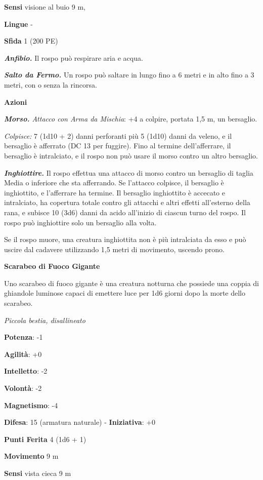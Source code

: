 \begin{multicols}{2}
\textbf{Sensi} visione al buio 9 m, 

\textbf{Lingue} -

\textbf{Sfida} 1 (200 PE)

\emph{\textbf{Anfibio.}} Il rospo può respirare aria e acqua.

\emph{\textbf{Salto da Fermo.}} Un rospo può saltare in lungo fino a 6
metri e in alto fino a 3 metri, con o senza la rincorsa.

\textbf{Azioni}

\emph{\textbf{Morso.} Attacco con Arma da Mischia}: +4 a colpire,
portata 1,5 m, un bersaglio.

\emph{Colpisce:} 7 (1d10 + 2) danni perforanti più 5 (1d10) danni da
veleno, e il bersaglio è afferrato (DC 13 per fuggire). Fino al termine
dell'afferrare, il bersaglio è intralciato, e il rospo non può usare il
morso contro un altro bersaglio.

\emph{\textbf{Inghiottire.}} Il rospo effettua una attacco di morso
contro un bersaglio di taglia Media o inferiore che sta afferrando. Se
l'attacco colpisce, il bersaglio è inghiottito, e l'afferrare ha
termine. Il bersaglio inghiottito è accecato e intralciato, ha copertura
totale contro gli attacchi e altri effetti all'esterno della rana, e
subisce 10 (3d6) danni da acido all'inizio di ciascun turno del rospo.
Il rospo può inghiottire solo un bersaglio alla volta.

Se il rospo muore, una creatura inghiottita non è più intralciata da
esso e può uscire dal cadavere utilizzando 1,5 metri di movimento,
uscendo prono.

\textbf{Scarabeo di Fuoco Gigante}

Uno scarabeo di fuoco gigante è una creatura notturna che possiede una
coppia di ghiandole luminose capaci di emettere luce per 1d6 giorni dopo
la morte dello scarabeo.

\emph{Piccola bestia, disallineato}

\textbf{Potenza}: -1

\textbf{Agilità}: +0

\textbf{Intelletto}: -2

\textbf{Volontà}: -2

\textbf{Magnetismo}: -4

\textbf{Difesa}: 15 (armatura naturale) - \textbf{Iniziativa}: +0

\textbf{Punti Ferita} 4 (1d6 + 1)

\textbf{Movimento} 9 m

\textbf{Sensi} vista cieca 9 m


\end{multicols}
